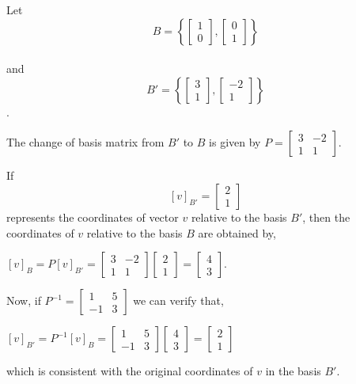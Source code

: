\begin{example}
Let 
\[ B = \left\{ \begin{bmatrix} 1 \\ 0 \end{bmatrix}, \begin{bmatrix} 0 \\ 1 \end{bmatrix} \right\} \] \\
and \[ B' = \left\{ \begin{bmatrix} 3 \\ 1 \end{bmatrix}, 
\begin{bmatrix} -2 \\ 1 \end{bmatrix} \right\} \].


The change of basis matrix from \( B' \) to \( B \) is given by \( P = \begin{bmatrix} 3 & -2 \\ 1 & 1 \end{bmatrix} \).

If \[ [v]_{B'} = \begin{bmatrix} 2 \\ 1 \end{bmatrix} \] represents the coordinates of vector \( v \) relative to the basis \( B' \), then the coordinates of \( v \) relative to the basis \( B \) are obtained by,
\begin{center}
    \( [v]_B = P[v]_{B'} = \begin{bmatrix} 3 & -2 \\ 1 & 1 \end{bmatrix} \begin{bmatrix} 2 \\ 1 \end{bmatrix} = \begin{bmatrix} 4 \\ 3 \end{bmatrix} \).
\end{center}


Now, if \( P^{-1} = \begin{bmatrix} 1 & 5 \\ -1 & 3 \end{bmatrix} \)
we can verify that,
\begin{center}
    \( [v]_{B'} = P^{-1}[v]_B = \begin{bmatrix} 1 & 5 \\ -1 & 3 \end{bmatrix} \begin{bmatrix} 4 \\ 3 \end{bmatrix} = \begin{bmatrix} 2 \\ 1 \end{bmatrix} \)
\end{center}
 which is consistent with the original coordinates of \( v \) in the basis \( B' \).
\end{example}
    





